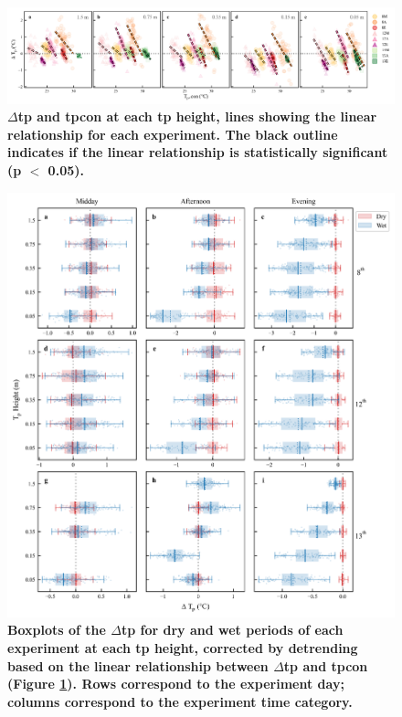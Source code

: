 \documentclass[final,3p,times,authoryear]{elsarticle}
\begin{document}
\begin{figure}
\centering
\includegraphics[trim={0 0 0 0},clip,scale=1.0]{pict039.png}
\caption{\bf $\Delta$\gls{tp} and \gls{tpcon} at each \gls{tp} height, lines showing the linear relationship for each experiment. The black outline indicates if the linear relationship is statistically significant (\gls{p} $<$ 0.05).}
 \label{fig:7.10}
\end{figure}



\begin{figure}
\centering
\includegraphics[trim={0 0 0 0},clip,scale=1.0]{pict040.png}
\caption{\bf Boxplots of the $\Delta$\gls{tp} for dry and wet periods of each experiment at each \gls{tp} height, corrected by detrending based on the linear relationship between $\Delta$\gls{tp} and \gls{tpcon} (Figure \ref{fig:7.10}). Rows correspond to the experiment day; columns correspond to the experiment time category.}
 \label{fig:7.11}
\end{figure}
\end{document}
